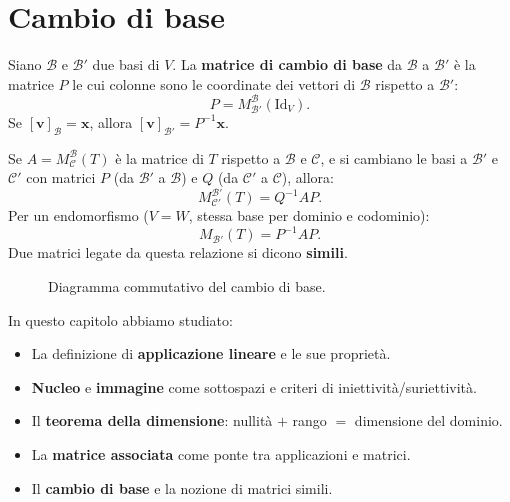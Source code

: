 \section{Cambio di base}
\label{sec:cambio-base}

\begin{definitionbox}
Siano $\mathcal{B}$ e $\mathcal{B}'$ due basi di $V$. La \textbf{matrice di cambio di base} da $\mathcal{B}$ a $\mathcal{B}'$ è la matrice $P$ le cui colonne sono le coordinate dei vettori di $\mathcal{B}$ rispetto a $\mathcal{B}'$:
\[ P = M_{\mathcal{B}'}^{\mathcal{B}}(\text{Id}_V). \]
Se $[\mathbf{v}]_{\mathcal{B}} = \mathbf{x}$, allora $[\mathbf{v}]_{\mathcal{B}'} = P^{-1} \mathbf{x}$.
\end{definitionbox}

\begin{theorembox}
\label{thm:cambio-base}
Se $A = M_{\mathcal{C}}^{\mathcal{B}}(T)$ è la matrice di $T$ rispetto a $\mathcal{B}$ e $\mathcal{C}$, e si cambiano le basi a $\mathcal{B}'$ e $\mathcal{C}'$ con matrici $P$ (da $\mathcal{B}'$ a $\mathcal{B}$) e $Q$ (da $\mathcal{C}'$ a $\mathcal{C}$), allora:
\[ M_{\mathcal{C}'}^{\mathcal{B}'}(T) = Q^{-1} A P. \]
Per un endomorfismo ($V = W$, stessa base per dominio e codominio):
\[ M_{\mathcal{B}'}(T) = P^{-1} A P. \]
Due matrici legate da questa relazione si dicono \textbf{simili}.
\end{theorembox}

\begin{figure}[htbp]
\centering
{}
\caption{Diagramma commutativo del cambio di base.}
\label{fig:cambio-base}
\end{figure}

\begin{notebox}
In questo capitolo abbiamo studiato:
\begin{itemize}
    \item La definizione di \textbf{applicazione lineare} e le sue proprietà.
    \item \textbf{Nucleo} e \textbf{immagine} come sottospazi e criteri di iniettività/suriettività.
    \item Il \textbf{teorema della dimensione}: nullità $+$ rango $=$ dimensione del dominio.
    \item La \textbf{matrice associata} come ponte tra applicazioni e matrici.
    \item Il \textbf{cambio di base} e la nozione di matrici simili.
\end{itemize}
\end{notebox}
